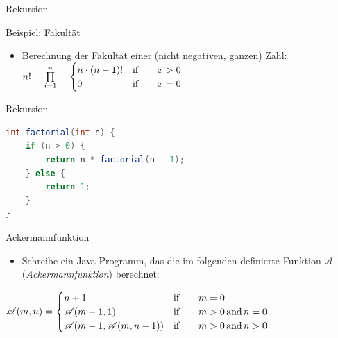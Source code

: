 \documentclass[18pt]{beamer}
\begin{document}
\begin{frame}{Rekursion}
    \begin{exampleblock}{Beispiel: Fakultät}
        \begin{itemize}
            \item Berechnung der Fakultät einer (nicht negativen, ganzen) Zahl:\\
            \vspace{.2in}
            $
            n! = \prod\limits_{i=1}^{n} =
                \begin{cases}
                    n \cdot (n-1)! & \text{if\qquad} x > 0 \\
                    0 & \text{if\qquad} x = 0
                \end{cases}
            $
        \end{itemize}
    \end{exampleblock}
\end{frame}

\begin{frame}[fragile]{Rekursion}
    \begin{exampleblock}{}
        \begin{lstlisting}[language=Java,basicstyle=\scriptsize]
int factorial(int n) {
    if (n > 0) {
        return n * factorial(n - 1);
    } else {
        return 1;
    }
}
        \end{lstlisting}

    \end{exampleblock}

\end{frame}

\begin{frame}[fragile]{Ackermannfunktion}
    \begin{itemize}
        \item Schreibe ein Java-Programm, das die im folgenden definierte Funktion $\mathscr{A}$ (\textit{Ackermannfunktion}) berechnet:
    \end{itemize}
    \begin{exampleblock}{}
        $
        \mathscr{A}(m, n) =
        \begin{cases}
            n+1 & \text{if\qquad} m = 0\\
            \mathscr{A}(m-1, 1) & \text{if\qquad} m > 0 \text{\,and\,} n = 0\\
            \mathscr{A}(m-1, \mathscr{A}(m, n-1)) & \text{if\qquad} m > 0 \text{\,and\,} n > 0
        \end{cases}
        $
    \end{exampleblock}

\end{frame}
\end{document}
